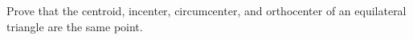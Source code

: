 Prove that the centroid, incenter, circumcenter, and orthocenter of an equilateral triangle are the same point.
